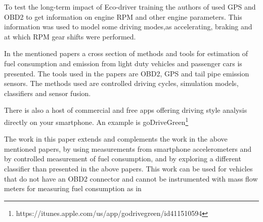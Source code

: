 To test the long-term impact of Eco-driver training the authors of \cite{beusen2009using} used GPS and OBD2 to get information on engine RPM and other engine parameters. This information was used to model some driving modes,as accelerating, braking and at which RPM gear shifts were performed.

In the mentioned papers a cross section of methods and tools for estimation of fuel consumption and emission from light duty vehicles and passenger cars is presented. The tools used in the papers are OBD2, GPS and tail pipe emission sensors. The methods used are controlled driving cycles, simulation models, classifiers and sensor fusion.

There is also a host of commercial and free apps offering driving style analysis directly on your smartphone. An example is goDriveGreen\footnote{https://itunes.apple.com/us/app/godrivegreen/id411510594}
 
The work in this paper extends and complements the work in the above mentioned papers, by using measurements from smartphone accelerometers and by controlled measurement of fuel consumption, and by exploring a different classifier than presented in the above papers. This work can be used for vehicles that do not have an OBD2 connector and cannot be instrumented with mass flow meters for measuring fuel consumption as in \cite{haan2000,Honicky}

